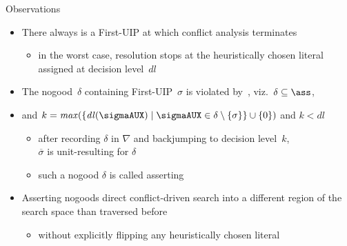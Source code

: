 \begin{frame}{Observations}
  \bigskip
  \begin{itemize}
  \item<2->
    There always is a First-UIP at which conflict analysis terminates
    \begin{itemize}\normalsize
    \item
      in the worst case, resolution stops at the
      heuristically chosen literal assigned at decision level~$\mathit{dl}$
    \end{itemize}
    \smallskip
  \item<3->
    The nogood~$\delta$ containing First-UIP~$\sigma$ is violated by~\ass,
    viz.\ $\delta\subseteq\ass$,
  \item<3->[] and $k=\mathit{max}(\{\mathit{dl}(\sigmaAUX)\mid\sigmaAUX\in\delta\setminus\{\sigma\}\}\cup\{0\})$ and $k<\mathit{dl}$
    \begin{itemize}\normalsize
    \item
      after recording $\delta$ in $\nabla$ and backjumping to decision level~$k$,\\
      $\overline{\sigma}$ is unit-resulting for $\delta$
    \item
      such a nogood $\delta$ is called \alert{asserting}
    \end{itemize}
    \smallskip
  \item<4-> Asserting nogoods direct conflict-driven search into a different region of the search space than traversed before
    \begin{itemize}\normalsize
    \item without explicitly flipping any heuristically chosen literal
    \end{itemize}
  \end{itemize}
\end{frame}
%
